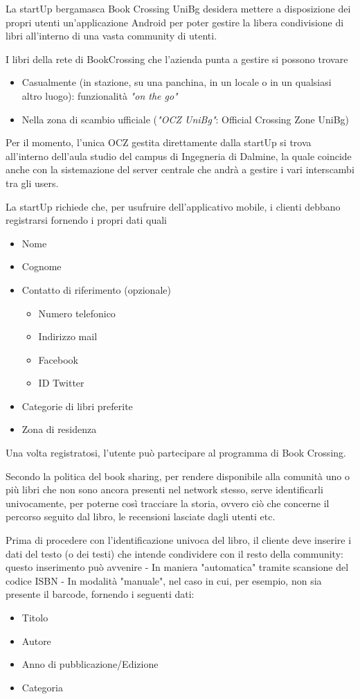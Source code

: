 La startUp bergamasca Book Crossing UniBg desidera mettere a disposizione dei propri
utenti un'applicazione Android per poter gestire la libera condivisione di libri all'interno di una vasta community di utenti.

I libri della rete di BookCrossing che l'azienda punta a gestire si possono trovare
\begin{itemize}
	\item Casualmente (in stazione, su una panchina, in un locale o in un qualsiasi altro luogo): funzionalità \textit{"on the go"}
	\item Nella zona di scambio ufficiale (\textit{"OCZ UniBg"}: Official Crossing Zone UniBg)
\end{itemize}

Per il momento, l'unica OCZ gestita direttamente dalla startUp si trova all'interno dell'aula studio del campus di Ingegneria di Dalmine, la quale coincide anche con la sistemazione del server centrale che andrà a gestire i vari interscambi tra gli users.

La startUp richiede che, per usufruire dell'applicativo mobile, i clienti debbano registrarsi fornendo i propri dati quali
\begin{itemize}
	\item Nome
	\item Cognome
	\item Contatto di riferimento (opzionale)
	\begin{itemize}
		\item Numero telefonico
		\item Indirizzo mail
		\item Facebook
		\item ID Twitter
	\end{itemize}
	\item Categorie di libri preferite
	\item Zona di residenza
\end{itemize}

Una volta registratosi, l'utente può partecipare al programma di Book Crossing.

Secondo la politica del book sharing, per rendere disponibile alla comunità 
uno o più libri che non sono ancora presenti nel network stesso, 
serve
identificarli univocamente, per poterne così tracciare la storia, ovvero ciò 
che concerne il percorso seguito dal libro, le recensioni lasciate dagli utenti etc.

Prima di procedere con l'identificazione univoca del libro, il cliente deve inserire i dati 
del testo (o dei testi) che intende condividere con il resto della community: questo inserimento può avvenire
- In maniera "automatica" tramite scansione del codice ISBN
- In modalità "manuale", nel caso in cui, per esempio, non sia presente il barcode, fornendo i 
seguenti dati:
\begin{itemize}
	\item Titolo
	\item Autore
	\item Anno di pubblicazione/Edizione
	\item Categoria
\end{itemize}

